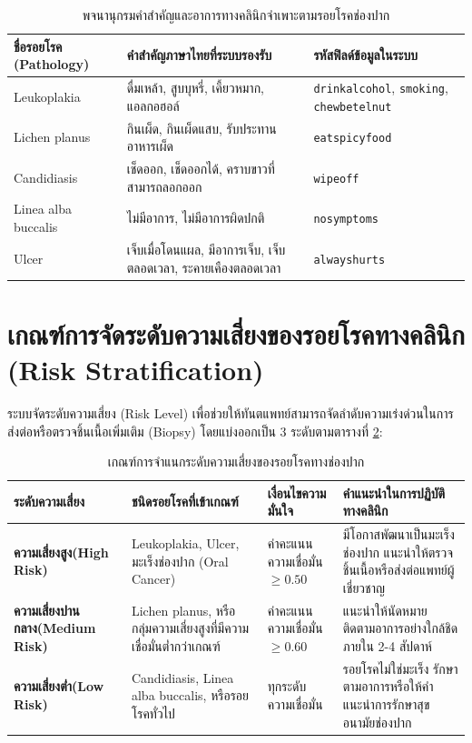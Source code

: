 \begin{table}[htbp]
\centering
\small
\caption{พจนานุกรมคำสำคัญและอาการทางคลินิกจำเพาะตามรอยโรคช่องปาก}
\label{tab:clinical_symptoms}
\begin{tabular}{p{3.2cm}p{5.5cm}p{4.5cm}}
\toprule
\textbf{ชื่อรอยโรค (Pathology)} & \textbf{คำสำคัญภาษาไทยที่ระบบรองรับ} & \textbf{รหัสฟิลด์ข้อมูลในระบบ} \\
\midrule
Leukoplakia & ดื่มเหล้า, สูบบุหรี่, เคี้ยวหมาก, แอลกอฮอล์ & \texttt{drinkalcohol}, \texttt{smoking}, \texttt{chewbetelnut} \\
\midrule
Lichen planus & กินเผ็ด, กินเผ็ดแสบ, รับประทานอาหารเผ็ด & \texttt{eatspicyfood} \\
\midrule
Candidiasis & เช็ดออก, เช็ดออกได้, คราบขาวที่สามารถลอกออก & \texttt{wipeoff} \\
\midrule
Linea alba buccalis & ไม่มีอาการ, ไม่มีอาการผิดปกติ & \texttt{nosymptoms} \\
\midrule
Ulcer & เจ็บเมื่อโดนแผล, มีอาการเจ็บ, เจ็บตลอดเวลา, ระคายเคืองตลอดเวลา & \texttt{alwayshurts} \\
\bottomrule
\end{tabular}
\end{table}

\section{เกณฑ์การจัดระดับความเสี่ยงของรอยโรคทางคลินิก (Risk Stratification)}
ระบบจัดระดับความเสี่ยง (Risk Level) เพื่อช่วยให้ทันตแพทย์สามารถจัดลำดับความเร่งด่วนในการส่งต่อหรือตรวจชิ้นเนื้อเพิ่มเติม (Biopsy) โดยแบ่งออกเป็น 3 ระดับตามตารางที่ \ref{tab:risk_levels}:

\begin{table}[htbp]
\centering
\small
\caption{เกณฑ์การจำแนกระดับความเสี่ยงของรอยโรคทางช่องปาก}
\label{tab:risk_levels}
\begin{tabular}{p{2.5cm}p{4cm}p{3cm}p{4cm}}
\toprule
\textbf{ระดับความเสี่ยง} & \textbf{ชนิดรอยโรคที่เข้าเกณฑ์} & \textbf{เงื่อนไขความมั่นใจ} & \textbf{คำแนะนำในการปฏิบัติทางคลินิก} \\
\midrule
\textbf{ความเสี่ยงสูง\newline(High Risk)} & Leukoplakia, Ulcer, มะเร็งช่องปาก (Oral Cancer) & ค่าคะแนนความเชื่อมั่น $\ge 0.50$ & มีโอกาสพัฒนาเป็นมะเร็งช่องปาก แนะนำให้ตรวจชิ้นเนื้อหรือส่งต่อแพทย์ผู้เชี่ยวชาญ \\
\midrule
\textbf{ความเสี่ยงปานกลาง\newline(Medium Risk)} & Lichen planus, หรือกลุ่มความเสี่ยงสูงที่มีความเชื่อมั่นต่ำกว่าเกณฑ์ & ค่าคะแนนความเชื่อมั่น $\ge 0.60$ & แนะนำให้นัดหมายติดตามอาการอย่างใกล้ชิดภายใน 2-4 สัปดาห์ \\
\midrule
\textbf{ความเสี่ยงต่ำ\newline(Low Risk)} & Candidiasis, Linea alba buccalis, หรือรอยโรคทั่วไป & ทุกระดับความเชื่อมั่น & รอยโรคไม่ใช่มะเร็ง รักษาตามอาการหรือให้คำแนะนำการรักษาสุขอนามัยช่องปาก \\
\bottomrule
\end{tabular}
\end{table}

